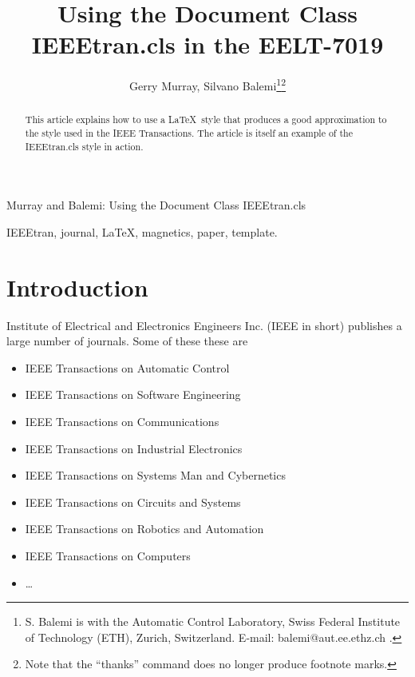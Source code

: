 \documentclass[journal,transmag]{IEEEtran}
\begin{document}
\title{Using the Document Class IEEEtran.cls in the EELT-7019} %

\author{Gerry Murray, Silvano Balemi\thanks{S. Balemi is with the
Automatic Control Laboratory, Swiss Federal Institute of Technology
(ETH), Zurich, Switzerland. E-mail: balemi@aut.ee.ethz.ch .}\thanks{Note
that the ``thanks'' command does no longer produce footnote marks.}}

{Murray and Balemi: Using the Document Class IEEEtran.cls} %


\maketitle

\begin{abstract}
This article explains how to use a \LaTeX\ style that produces a good
approximation to the style used in the IEEE Transactions.  The article
is itself an example of the IEEEtran.cls style in action.
\end{abstract}

\begin{IEEEkeywords}
    IEEEtran, journal, \LaTeX, magnetics, paper, template.
\end{IEEEkeywords}

\section{Introduction}
 Institute of Electrical and Electronics Engineers
Inc. (IEEE in short) publishes a large number of journals.  Some of
these these are

\begin{itemize}
\item IEEE Transactions on Automatic Control
\item IEEE Transactions on Software Engineering
\item IEEE Transactions on Communications
\item IEEE Transactions on Industrial Electronics
\item IEEE Transactions on Systems Man and Cybernetics
\item IEEE Transactions on Circuits and Systems
\item IEEE Transactions on Robotics and Automation
\item IEEE Transactions on Computers
\item \ldots{}
\end{itemize}
\end{document}
